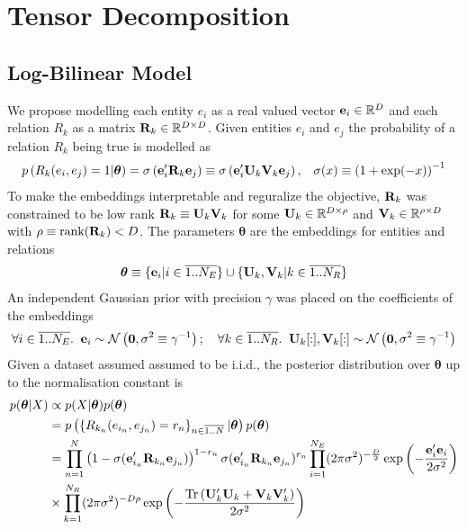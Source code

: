 \documentclass[a4paper, 11pt, fleqn]{article}
\newcommand{\btheta}[0]{\boldsymbol{\theta}}
\begin{document}
\section{Tensor Decomposition}

\subsection{Log-Bilinear Model}
We propose modelling each entity $e_i$ as a real valued vector ${\bf
e}_i \in \mathbb{R}^D$ and each relation $R_k$ as a matrix ${\bf R}_k
\in \mathbb{R}^{D \times D}$. Given entities $e_i$ and $e_j$
the probability of a relation $R_k$ being true is modelled as
\begin{align}
  &p\left(R_k(e_i, e_j) = 1\vert \btheta\right) = \sigma\left({\bf
      e}'_i{\bf R}_k{\bf e}_j\right) \equiv \sigma\left({\bf
      e}'_i{\bf U}_k{\bf V}_k{\bf e}_j\right),
&\sigma(x) \equiv \left(1 + \exp(-x)\right)^{-1}
\end{align}
\noindent To make the embeddings interpretable and reguralize the
objective, ${\bf R}_k$ was constrained to be low rank ${\bf R}_k
\equiv {\bf U}_k{\bf V}_k$ for
some $ {\bf U}_k \in \mathbb{R}^{D
  \times \rho}$ and $ {\bf V}_k \in \mathbb{R}^{\rho \times D}$ with
$\rho \equiv \text{rank}({\bf R}_k) < D$. The parameters $\btheta$ are
the embeddings for entities and relations
\begin{align}
\btheta \equiv \{{\bf e}_i \vert i \in \overline{1..N_E}\} \cup
 \{{\bf U}_k, {\bf V}_k \vert k \in \overline{1..N_R}\}
\end{align}
An independent Gaussian prior with precision $\gamma$ was placed on
the coefficients of the embeddings
\begin{align}
  \forall i \in \overline{1..N_E}.\;\; {\bf e}_i \sim
  \mathcal{N}\left({\bf 0}, \sigma^2 \equiv \gamma^{-1}\right); \quad
  \forall k \in \overline{1..N_R}.\;\; {\bf U}_k[:], {\bf V}_k[:] \sim
  \mathcal{N}\left({\bf 0}, \sigma^2 \equiv \gamma^{-1}\right)
\end{align}
Given a dataset assumed assumed to be i.i.d., the posterior
distribution over $\btheta$ up to the normalisation constant is
\begin{align}
  \label{eqn:prob_dataset}
  p(\btheta\vert X) &\propto p(X\vert \btheta)p(\btheta) \nonumber \\
&= p\left(\left\{R_{k_n}(e_{i_n}, e_{j_n})=r_n\right\}_{n\in\overline{1..N}}\vert
    \btheta\right) p(\btheta)\nonumber \\
  &= \prod_{n=1}^{N}\left(1 - \sigma({\bf e}'_{i_n}{\bf R}_{k_n}{\bf
     e}_{j_n})\right)^{1 - r_n}\sigma({\bf e}'_{i_n}{\bf R}_{k_n}{\bf
      e}_{j_n})^{r_n} \prod_{i=1}^{N_E} (2\pi\sigma^2)^{-\frac{D}{2}}
    \exp\left(-\frac{{\bf e}_i'{\bf e}_i}{2\sigma^2}\right) \nonumber \\
&\times \prod_{k=1}^{N_R} (2\pi\sigma^2)^{-D\rho}
    \exp\left(-\frac{\text{Tr}\left({\bf U}_k'{\bf U}_k + {\bf V}_k{\bf V}_k'\right)}{2\sigma^2}\right)
\end{align}
\end{document}

